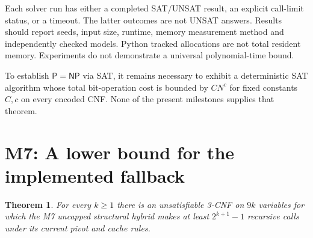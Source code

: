 \documentclass[11pt,a4paper]{article}
\newtheorem{theorem}{Theorem}
\begin{document}
Each solver run has either a completed SAT/UNSAT result,
an explicit call-limit status, or a timeout. The latter outcomes
are not UNSAT answers. Results should report seeds, input size,
runtime, memory measurement method and independently checked
models. Python tracked allocations are not total resident memory.
Experiments do not demonstrate a universal polynomial-time bound.

To establish $\mathsf{P}=\mathsf{NP}$ via SAT, it remains necessary
to exhibit a deterministic SAT algorithm whose total bit-operation
cost is bounded by $CN^c$ for fixed constants $C,c$ on every
encoded CNF. None of the present milestones supplies that theorem.

\section{M7: A lower bound for the implemented fallback}
\begin{theorem}
For every $k\ge1$ there is an unsatisfiable 3-CNF on $9k$ variables
for which the M7 uncapped structural hybrid makes at least $2^{k+1}-1$
recursive calls under its current pivot and cache rules.
\end{theorem}
\end{document}
